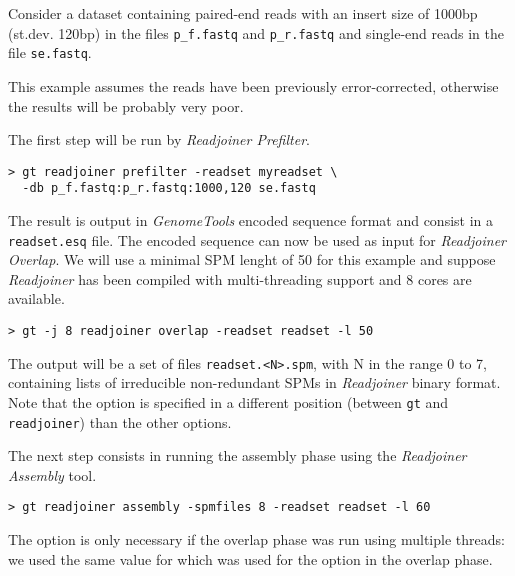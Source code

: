 \documentclass[12pt,titlepage]{article}
\newcommand{\GenomeTools}{\textit{GenomeTools}\xspace}
\newcommand{\Readjoiner}{\textit{Readjoiner}\xspace}
\newcommand{\Rdjprefilter}{\textit{Readjoiner Prefilter}\xspace}
\newcommand{\Rdjoverlap}{\textit{Readjoiner Overlap}\xspace}
\newcommand{\Rdjassembly}{\textit{Readjoiner Assembly}\xspace}
\begin{document}
Consider a dataset containing paired-end reads with an insert size
of 1000bp (st.dev. 120bp)
in the files \texttt{p\_f.fastq} and \texttt{p\_r.fastq}
and single-end reads
in the file \texttt{se.fastq}.

This example assumes the reads have been previously error-corrected,
otherwise the results will be probably very poor.

The first step will be run by \Rdjprefilter.

\begin{footnotesize}
\begin{verbatim}
> gt readjoiner prefilter -readset myreadset \
  -db p_f.fastq:p_r.fastq:1000,120 se.fastq
\end{verbatim}
\end{footnotesize}

The result is output in
\GenomeTools encoded sequence format and consist in a \texttt{readset.esq} file.
The encoded sequence can now be used as input for \Rdjoverlap. We will use
a minimal SPM lenght of 50 for this example and suppose \Readjoiner has been
compiled with multi-threading support and 8 cores are available.

\begin{footnotesize}
\begin{verbatim}
> gt -j 8 readjoiner overlap -readset readset -l 50
\end{verbatim}
\end{footnotesize}

The output will be a set of files \texttt{readset.<N>.spm}, with N in the
range 0 to 7, containing
lists of irreducible non-redundant SPMs in \Readjoiner binary format.
Note that the \Showoption{j} option is specified in a different position
(between \texttt{gt} and \texttt{readjoiner}) than the other options.

The next step consists in running the assembly phase using the
\Rdjassembly tool.

\begin{footnotesize}
\begin{verbatim}
> gt readjoiner assembly -spmfiles 8 -readset readset -l 60
\end{verbatim}
\end{footnotesize}

The  option is only necessary if the overlap phase
was run using multiple threads: we used the same value for 
which was used for the \Showoption{j} option in the overlap phase.
\end{document}
